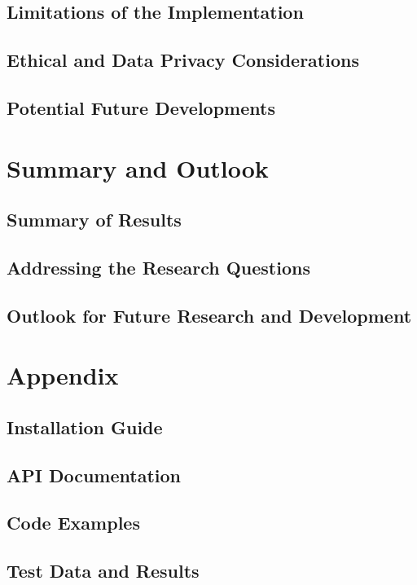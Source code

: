 \documentclass{article}
\begin{document}
\subsection{Limitations of the Implementation}
\subsection{Ethical and Data Privacy Considerations}
\subsection{Potential Future Developments}

\newpage

\section{Summary and Outlook}

\subsection{Summary of Results}
\subsection{Addressing the Research Questions}
\subsection{Outlook for Future Research and Development}

\newpage

\newpage

\appendix
\section*{Appendix}
\subsection*{Installation Guide}
\subsection*{API Documentation}
\subsection*{Code Examples}
\subsection*{Test Data and Results}



\end{document}
